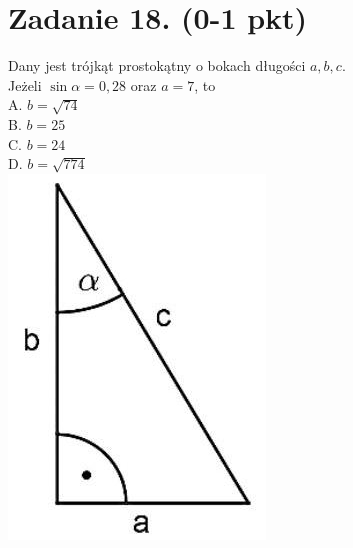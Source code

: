 \documentclass[10pt]{article}
\begin{document}
\section*{Zadanie 18. (0-1 pkt)}
Dany jest trójkąt prostokątny o bokach długości \(a, b, c\).\\
Jeżeli \(\sin \alpha=0,28\) oraz \(a=7\), to\\
A. \(b=\sqrt{74}\)\\
B. \(b=25\)\\
C. \(b=24\)\\
D. \(b=\sqrt{774}\)\\
\includegraphics[max width=\textwidth, center]{2024_11_21_997c30e0b98e62837d84g-08(1)}
\end{document}
